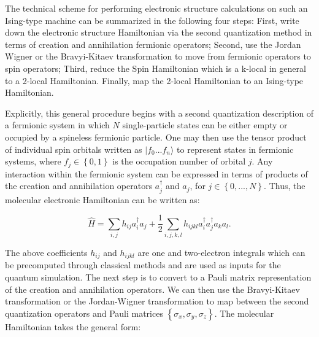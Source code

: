 \documentclass{article}
\begin{document}
The technical scheme for performing electronic structure calculations on such an Ising-type machine can be summarized in the following four steps: First, write down the electronic structure Hamiltonian via the second quantization method in terms of creation and annihilation fermionic operators; Second, use the Jordan Wigner or the Bravyi-Kitaev transformation to move from fermionic operators to spin operators\cite{bravyi2002fermionic}; Third, reduce the Spin Hamiltonian which is a k-local in general to a 2-local Hamiltonian. Finally, map the 2-local Hamiltonian to an Ising-type Hamiltonian. 

Explicitly, this general procedure begins with a second quantization description of a fermionic system in which $N$ single-particle states can be either empty or occupied by a spineless fermionic particle\cite{mcweeny1969methods,szabo1989modern}. One may then use the tensor product of individual spin orbitals written as $|f_{0}...f_n \rangle$ to represent states in fermionic systems, where $f_j \in \left\{ 0,1 \right\}$ is the occupation number of orbital $j$. Any interaction within the fermionic system can be expressed in terms of products of the creation and annihilation operators $a_j^{\dagger}$ and $a_j$, for $j \in \left\{0, ..., N\right\}$. Thus, the molecular electronic Hamiltonian can be written as:

\begin{equation}
\hat H= \sum_{i,j}h_{ij}a_i^\dagger a_j+\frac{1}{2}\sum_{i,j,k,l} h_{ijkl}a_i^\dagger a_j^\dagger a_ka_l.
\end{equation}

The above coefficients $h_{ij}$ and $h_{ijkl}$ are one and two-electron integrals which can be precomputed through classical methods and are used as inputs for the quantum simulation. The next step is to convert to a Pauli matrix representation of the creation and annihilation operators. We can then use the Bravyi-Kitaev transformation or the Jordan-Wigner transformation\cite{bravyi2002fermionic, seeley2012bravyi} to map between the second quantization operators and Pauli matrices $\left\{\sigma_x,\sigma_y,\sigma_z\right\}$. The molecular Hamiltonian takes the general form:
\end{document}
